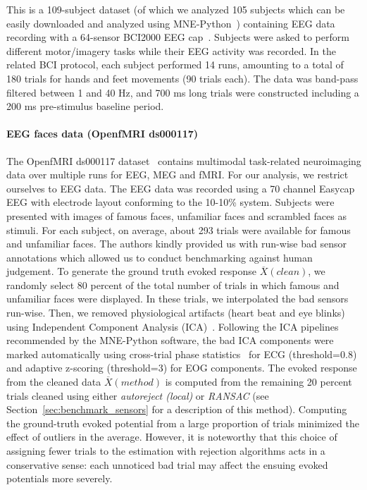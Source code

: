 This is a 109-subject dataset (of which we analyzed 105 subjects which can be easily downloaded and analyzed using MNE-Python~\citep{gramfort2013meg}) containing EEG data recording with a 64-sensor BCI2000 EEG cap~\citep{schalk2004bci2000}. Subjects were asked to perform different motor/imagery tasks while their EEG activity was recorded. In the related BCI protocol, each subject performed 14 runs, amounting to a total of 180 trials for hands and feet movements (90 trials each). The data was band-pass filtered between 1 and 40 Hz, and 700 ms long trials were constructed including a 200 ms pre-stimulus baseline period.

\paragraph{EEG faces data (OpenfMRI ds000117)}

The OpenfMRI ds000117 dataset~\citep{wakeman2015multi} contains multimodal task-related neuroimaging data over multiple runs for EEG, MEG and fMRI. For our analysis, we restrict ourselves to EEG data. The EEG data was recorded using a 70 channel Easycap EEG with electrode layout conforming to the 10-10\% system. Subjects were presented with images of famous faces, unfamiliar faces and scrambled faces as stimuli. For each subject, on average, about 293 trials were available for famous and unfamiliar faces. The authors kindly provided us with run-wise bad sensor annotations which allowed us to conduct benchmarking against human judgement. To generate the ground truth evoked response $\overbar{X}(clean)$, we randomly select 80 percent of the total number of trials in which famous and unfamiliar faces were displayed. In these trials, we interpolated the bad sensors run-wise. Then, we removed physiological artifacts (heart beat and eye blinks) using Independent Component Analysis (ICA)~\citep{vigario2000independent}. Following the ICA pipelines recommended by the MNE-Python software, the bad ICA components were marked automatically using cross-trial phase statistics~\citep{dammers2008integration} for ECG (threshold=0.8) and adaptive z-scoring (threshold=3) for EOG components. The evoked response from the cleaned data $\overbar{X}(method)$ is computed from the remaining 20 percent trials cleaned using either \emph{autoreject (local)} or \emph{RANSAC} (see Section~\ref{sec:benchmark_sensors} for a description of this method). Computing the ground-truth evoked potential from a large proportion of trials minimized the effect of outliers in the average. However, it is noteworthy that this choice of assigning fewer trials to the estimation with rejection algorithms acts in a conservative sense: each unnoticed bad trial may affect the ensuing evoked potentials more severely.

